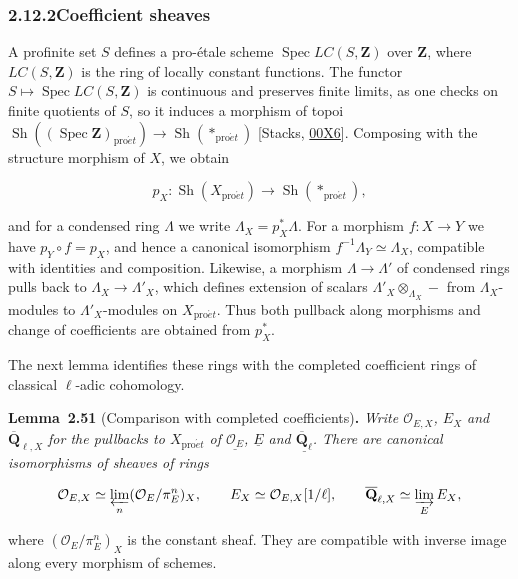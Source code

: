 \documentclass[11pt]{article}
\newenvironment{bpstatement}[2]{\par\addvspace{0.6\baselineskip}\noindent\textbf{#1}#2\textbf{.}\enspace\ignorespaces}
  {\par\addvspace{0.4\baselineskip}}
\newenvironment{bpstatementit}[2]{\begin{bpstatement}{#1}{#2}\itshape\ignorespaces}{\end{bpstatement}}
\providecommand{\QbarX}{}\renewcommand{\QbarX}{\overline{\mathbf Q}_{\ell,X}}
\providecommand{\Sh}{}\renewcommand{\Sh}{\operatorname{Sh}}
\begin{document}
\subsubsection*{\texorpdfstring{2.12.2\quad Coefficient sheaves}{2.12.2 Coefficient sheaves}}
\label{bp154}%
\label{bp155}%
A profinite set \(S\) defines a pro-étale scheme \(\operatorname{Spec}LC(S,\mathbf Z)\) over \(\mathbf Z\), where \(LC(S,\mathbf Z)\) is the ring of locally constant functions. The functor \(S\mapsto\operatorname{Spec}LC(S,\mathbf Z)\) is continuous and preserves finite limits, as one checks on finite quotients of \(S\), so it induces a morphism of topoi \(\Sh((\operatorname{Spec}\mathbf Z)_{\mathrm{pro}\acute{e}t})\to
\Sh(*_{\mathrm{pro}\acute{e}t})\) [Stacks, \href{https://stacks.math.columbia.edu/tag/00X6}{00X6}]. Composing with the structure morphism of \(X\), we obtain

\[
p_X:\Sh(X_{\mathrm{pro}\acute{e}t})\longrightarrow\Sh(*_{\mathrm{pro}\acute{e}t}),
\]

and for a condensed ring \(\Lambda\) we write \(\Lambda_X=p_X^*\Lambda\). For a morphism \(f:X\to Y\) we have \(p_Y\circ f=p_X\), and hence a canonical isomorphism \(f^{-1}\Lambda_Y\simeq\Lambda_X\), compatible with identities and composition. Likewise, a morphism \(\Lambda\to\Lambda'\) of condensed rings pulls back to \(\Lambda_X\to\Lambda'_X\), which defines extension of scalars \(\Lambda'_X\otimes_{\Lambda_X}-\) from \(\Lambda_X\)-modules to \(\Lambda'_X\)-modules on \(X_{\mathrm{pro}\acute{e}t}\). Thus both pullback along morphisms and change of coefficients are obtained from \(p_X^*\).

The next lemma identifies these rings with the completed coefficient rings of classical \(\ell\)-adic cohomology.

\label{bp156}%
\begin{bpstatementit}{Lemma~2.51}{ (Comparison with completed coefficients)}
Write \(\mathcal O_{E,X}\), \(E_X\) and \(\QbarX\) for the pullbacks to \(X_{\mathrm{pro}\acute{e}t}\) of \(\underline{\mathcal O_E}\), \(\underline E\) and \(\underline{\overline{\mathbf Q}_\ell}\). There are canonical isomorphisms of sheaves of rings

\[
\mathcal O_{E,X}\simeq\varprojlim_n(\mathcal O_E/\pi_E^n)_X,
\qquad E_X\simeq\mathcal O_{E,X}[1/\ell],
\qquad \QbarX\simeq\varinjlim_E E_X,
\]

where \((\mathcal O_E/\pi_E^n)_X\) is the constant sheaf. They are compatible with inverse image along every morphism of schemes.
\end{bpstatementit}
\end{document}
